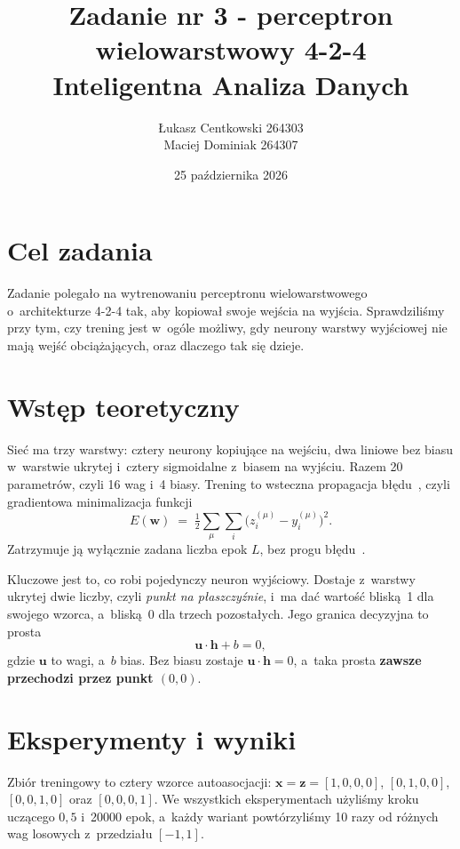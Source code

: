 \documentclass[12pt]{article}
\title{\textbf{Zadanie nr 3 - perceptron wielowarstwowy 4-2-4}\\[2mm]
       \large Inteligentna Analiza Danych}
\author{Łukasz Centkowski 264303 \\ Maciej Dominiak 264307}
\date{25 października 2026}
\begin{document}
\maketitle
\thispagestyle{empty}
\newpage

\section{Cel zadania}

Zadanie polegało na wytrenowaniu perceptronu wielowarstwowego o~architekturze
4-2-4 tak, aby kopiował swoje wejścia na wyjścia. Sprawdziliśmy przy tym, czy
trening jest w~ogóle możliwy, gdy neurony warstwy wyjściowej nie mają wejść
obciążających, oraz dlaczego tak się dzieje.

\section{Wstęp teoretyczny}

Sieć ma trzy warstwy: cztery neurony kopiujące na wejściu, dwa liniowe bez biasu
w~warstwie ukrytej i~cztery sigmoidalne z~biasem na wyjściu. Razem 20 parametrów,
czyli 16 wag i~4 biasy. Trening to wsteczna propagacja błędu~\cite{rumelhart},
czyli gradientowa minimalizacja funkcji
\begin{equation}
E(\mathbf{w}) \;=\; \tfrac{1}{2}\sum_{\mu}\sum_{i}
\bigl(z_i^{(\mu)} - y_i^{(\mu)}\bigr)^2 .
\label{eq:blad}
\end{equation}
Zatrzymuje ją wyłącznie zadana liczba epok $L$, bez progu
błędu~\cite{wyklad,osowski}.

Kluczowe jest to, co robi pojedynczy neuron wyjściowy. Dostaje z~warstwy ukrytej
dwie liczby, czyli \emph{punkt na płaszczyźnie}, i~ma dać wartość bliską~1 dla
swojego wzorca, a~bliską~0 dla trzech pozostałych. Jego granica decyzyjna to
prosta
\begin{equation}
\mathbf{u}\cdot\mathbf{h} + b = 0 ,
\label{eq:granica}
\end{equation}
gdzie $\mathbf{u}$ to wagi, a~$b$ bias. Bez biasu zostaje
$\mathbf{u}\cdot\mathbf{h} = 0$, a~taka prosta \textbf{zawsze przechodzi przez
punkt $(0,0)$}.

\section{Eksperymenty i wyniki}

Zbiór treningowy to cztery wzorce autoasocjacji: $\mathbf{x} = \mathbf{z} =
[1,0,0,0]$, $[0,1,0,0]$, $[0,0,1,0]$ oraz $[0,0,0,1]$. We wszystkich
eksperymentach użyliśmy kroku uczącego $0{,}5$ i~20000 epok, a~każdy wariant
powtórzyliśmy 10 razy od różnych wag losowych z~przedziału $[-1,1]$.
\end{document}
